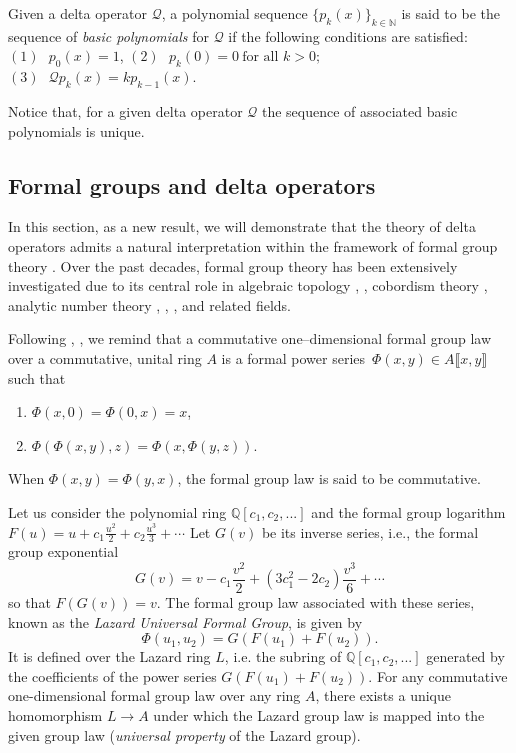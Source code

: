 \documentclass[10pt]{amsart}
\numberwithin{equation}{section}
\theoremstyle{definition}
\begin{document}
Given a delta operator $\mathcal{Q}$, a polynomial sequence
$\{p_{k}\left (x\right )\}_{k\in \mathbb{N}}$ is said to be the sequence
of \textit{basic polynomials} for $\mathcal{Q}$ if the following conditions
are satisfied: $ (1)\text{ \ } p_{0}\left ( x\right ) =1$,
$ (2)\text{ \ }p_{k}\left ( 0\right ) =0\ \text{for all }k>0;\text{ \ }$
$ (3)\text{ \ }\mathcal{Q} p_{k}\left ( x\right ) =kp_{k-1}\left ( x
\right )$.

Notice that, for a given delta operator $\mathcal{Q}$ the sequence of associated
basic polynomials is unique.

\subsection{Formal groups and delta operators}
\label{sec2.1}

In this section, as a new result, we will demonstrate that the theory of
delta operators admits a natural interpretation within the framework of
formal group theory \cite{Ray}. Over the past decades, formal group theory
has been extensively investigated due to its central role in algebraic
topology \cite{BMN}, \cite{Lazard}, cobordism theory \cite{Quillen}, analytic
number theory \cite{Honda}, \cite{PT2010}, \cite{TempestaTAMS}, and related
fields.

Following \cite{Haze}, \cite{BMN}, we remind that a commutative one--dimensional
formal group law over a commutative, unital ring $A$ is a formal power
series~$\Phi (x,y)\in A\llbracket x,y\rrbracket $ such that
\begin{enumerate}
\item  $\Phi (x,0)=\Phi (0,x)=x$,
\item 
$\Phi \left (\Phi (x,y),z\right )=\Phi \left (x,\Phi (y,z)\right )$.
\end{enumerate}
 When $\Phi (x,y)=\Phi (y,x)$, the formal group law is said to be commutative.

Let us consider the polynomial ring
$\mathbb{Q}\left [ c_{1},c_{2},...\right ] $ and the formal group logarithm
$ F\left ( u\right ) =u+c_{1}\frac{u^{2}}{2}+c_{2}\frac{u^{3}}{3}+
\cdots $ Let $G\left ( v\right ) $ be its inverse series, i.e., the formal
group exponential
\begin{equation}
G\left ( v\right ) =v-c_{1}\frac{v^{2}}{2}+\left ( 3c_{1}^{2}-2c_{2}
\right ) \frac{v^{3}}{6}+\cdots
\label{Ap12}
\end{equation}
so that \textit{$F\left ( G\left ( v\right ) \right ) =v$}. The formal group
law associated with these series, known as the
\textit{Lazard Universal Formal Group}, is given by
\begin{equation*}
\Phi \left ( u_{1},u_{2}\right ) =G\left ( F\left ( u_{1}\right ) +F
\left ( u_{2}\right ) \right ).
\end{equation*}
It is defined over the Lazard ring $L$, i.e. the subring of
$\mathbb{Q}\left [ c_{1},c_{2},...\right ] $ generated by the coefficients
of the power series
$G\left ( F\left ( u_{1}\right ) +F\left ( u_{2}\right ) \right ) $. For
any commutative one-dimensional formal group law over any ring $A$, there
exists a unique homomorphism $L\to A$ under which the Lazard group law
is mapped into the given group law (\textit{universal property} of the Lazard
group).
\end{document}
